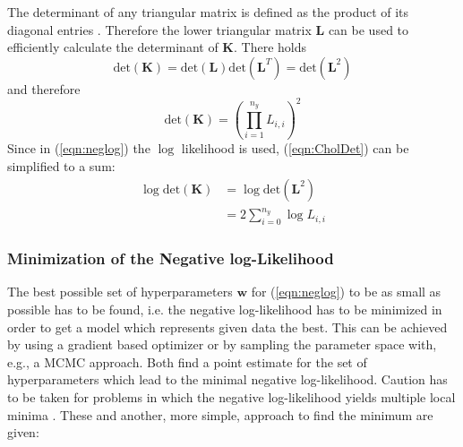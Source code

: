 \documentclass[%
  a4paper,oneside,%
  11pt,%
  smallchapters,
  style=printdev,
  extramargin,
  green,%
  rgb, <cmyk>
  ]{tubsbook}
\begin{document}
The determinant of any triangular matrix is defined as the product of its diagonal entries \cite{tomaskovic-moore}. Therefore the lower triangular matrix $\bm{L}$ can be used to efficiently calculate the determinant of $\bm{K}$. There holds
\begin{equation}
\mathrm{det} (\bm{K}) = \mathrm{det} (\bm{L}) \mathrm{det} (\bm{L}^T) = \mathrm{det} (\bm{L} ^2)
\end{equation}
and therefore
\begin{equation}
\mathrm{det} (\bm{K}) = \left(    \prod_{i=1}^{n_y}  L_{i,i}  \right)^2
\label{eqn:CholDet}
\end{equation}
%
Since in (\ref{eqn:neglog}) the $\log$ likelihood is used, (\ref{eqn:CholDet}) can be simplified to a sum:
%
\begin{align*}
\log{\mathrm{det} (\bm{K})} &= \log{\mathrm{det} (\bm{L}^2)} \\
&= 2 \sum_{i=0}^{n_y} \log{L_{i,i}}
\end{align*}

\subsubsection{Minimization of the Negative log-Likelihood}
The best possible set of hyperparameters $\bm{w}$ for (\ref{eqn:neglog}) to be as small as possible has to be found, i.e. the negative log-likelihood has to be minimized in order to get a model which represents given data the best. This can be achieved by using a gradient based optimizer or by sampling the parameter space with, e.g., a MCMC approach. Both find a point estimate for the set of hyperparameters which lead to the minimal negative log-likelihood. Caution has to be taken for problems in which the negative log-likelihood yields multiple local minima \cite{Svensson2015}.  These and another, more simple, approach to find the minimum are given:
\end{document}
